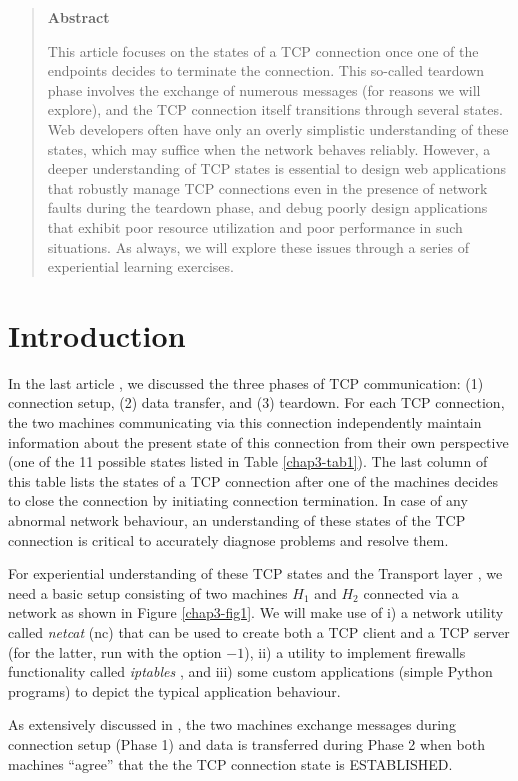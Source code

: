 \begin{multicols}{2}

\setcounter{figure}{0}
\begin{quotation}
\centerline{\bf Abstract}
\medskip

\noindent
This article focuses on the states of a TCP connection once one of the endpoints decides to terminate the connection. This so-called teardown phase involves the exchange of numerous messages (for reasons we will explore), and the TCP connection itself transitions through several states. Web developers often have only an overly simplistic understanding of these states, which may suffice when the network behaves reliably. However, a deeper understanding of TCP states is essential to design web applications that robustly manage TCP connections even in the presence of network faults during the teardown phase, and debug poorly design applications that exhibit poor resource utilization and poor performance in such situations. As always, we will explore these issues through a series of experiential learning exercises.
\end{quotation}


\section*{Introduction}


In the last article \cite{chap3-key8}, we discussed the three phases of TCP \cite{chap3-key1} communication: (1) connection setup, (2) data transfer, and (3) teardown. For each TCP connection, the two machines communicating via this connection independently maintain information about the present state of this connection from their own perspective (one of the 11 possible states listed in Table \ref{chap3-tab1}). The last column of this table lists the states of a TCP connection after one of the machines decides to close the connection by initiating connection termination. In case of any abnormal network behaviour, an understanding of these states of the TCP connection is critical to accurately diagnose problems and resolve them.

For experiential understanding of these TCP states and the Transport layer \cite{chap3-key2}, we need a basic setup consisting of two machines $H_{1}$ and $H_{2}$ connected via a network as shown in Figure \ref{chap3-fig1}. We will make use of i) a network utility called \textit{netcat} (nc) \cite{chap3-key5}\cite{chap3-key6} that can be used to create both a TCP client and a TCP server (for the latter, run with the option $-1$), ii) a utility to implement firewalls functionality called \textit{iptables} \cite{chap3-key7}, and iii) some custom applications (simple Python programs) to depict the typical application behaviour.

As extensively discussed in \cite{chap3-key8}, the two machines exchange messages during connection setup (Phase 1) and data is transferred during Phase 2 when both machines ``agree'' that the the TCP connection state is ESTABLISHED.
\end{multicols}

